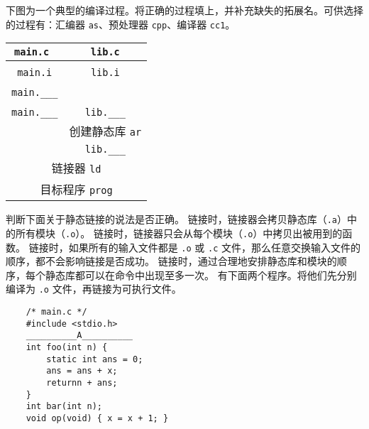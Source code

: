     \begin{problems}
        \pro 下图为一个典型的编译过程。将正确的过程填上，并补充缺失的拓展名。可供选择的过程有：汇编器 \verb|as|、预处理器 \verb|cpp|、编译器 \verb|cc1|。
        \begin{table}[H]
            \centering
            \begin{tabular}{cc}
                \texttt{\qquad \qquad main.c \qquad \qquad} & \texttt{\qquad \qquad \ lib.c \qquad \qquad} \\ \hline
                \multicolumn{1}{|c|}{} & \multicolumn{1}{c|}{} \\ \hline
                \texttt{main.i} & \texttt{lib.i} \\ \hline
                \multicolumn{1}{|c|}{} & \multicolumn{1}{c|}{} \\ \hline
                \verb|main.___| &  \\ \hline
                \multicolumn{1}{|c|}{} & \multicolumn{1}{c|}{} \\ \hline
                \verb|main.___| & \verb|lib.___| \\ \cline{2-2} 
                \multicolumn{1}{c|}{} & \multicolumn{1}{c|}{创建静态库 \texttt{ar}} \\ \cline{2-2} 
                & \verb|lib.___| \\ \hline
                \multicolumn{2}{|c|}{链接器 \texttt{ld}} \\ \hline
                \multicolumn{2}{c}{目标程序 \texttt{prog}}
            \end{tabular}
        \end{table}
        \pro 判断下面关于静态链接的说法是否正确。
            \qn 链接时，链接器会拷贝静态库（\verb|.a|）中的所有模块（\verb|.o|）。
            \qn 链接时，链接器只会从每个模块（\verb|.o|）中拷贝出被用到的函数。
            \qn 链接时，如果所有的输入文件都是 \verb|.o| 或 \verb|.c| 文件，那么任意交换输入文件的顺序，都不会影响链接是否成功。
            \qn 链接时，通过合理地安排静态库和模块的顺序，每个静态库都可以在命令中出现至多一次。
        \pro 有下面两个程序。将他们先分别编译为 \verb|.o| 文件，再链接为可执行文件。
        \begin{verbatim}
    /* main.c */
    #include <stdio.h>
    __________A__________
    int foo(int n) {
        static int ans = 0;
        ans = ans + x;
        returnn + ans;
    }
    int bar(int n);
    void op(void) { x = x + 1; }


\end{verbatim}
\end{problems}
